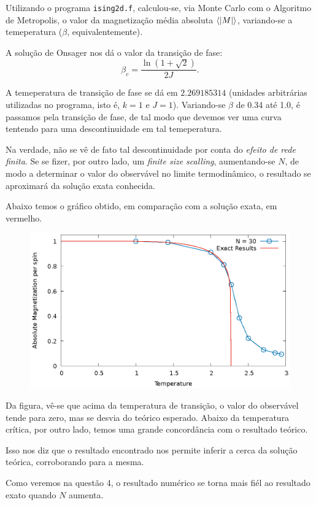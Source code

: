 



  Utilizando o programa \texttt{ising2d.f}, calculou-se, via Monte Carlo com o Algoritmo de Metropolis, o valor da magnetização média absoluta $\ev{\abs{M}}$, variando-se a temeperatura ($\beta$, equivalentemente).

  A solução de Onsager nos dá o valor da transição de fase:
  \begin{equation*}
    \beta_c = \frac{\ln(1+ \sqrt{2})}{2J} .
  \end{equation*}


  A temeperatura de transição de fase se dá em $2.269185314$ (unidades arbitrárias utilizadas no programa, isto é, $k = 1$ e $J = 1$). Variando-se $\beta$ de 0.34 até 1.0, é passamos pela transição de fase, de tal modo que devemos ver uma curva tentendo para uma descontinuidade em tal temeperatura.

  Na verdade, não se vê de fato tal descontinuidade por conta do \textit{efeito de rede finita}. Se se fizer, por outro lado, um \textit{finite size scalling}, aumentando-se $N$, de modo a determinar o valor do observável no limite termodinâmico, o resultado se aproximará da solução exata conhecida.

  Abaixo temos o gráfico obtido, em comparação com a solução exata, em vermelho.

  \begin{figure}[h]
    \includegraphics[scale = 1.0]{Mabs.eps}
  \end{figure}

  \newpage
  Da figura, vê-se que acima da temperatura de transição, o valor do observável tende para zero, mas se desvia do teórico esperado. Abaixo da temperatura crítica, por outro lado, temos uma grande concordância com o resultado teórico.

  Isso nos diz que o resultado encontrado nos permite inferir a cerca da solução teórica, corroborando para a mesma.

  Como veremos na questão 4, o resultado numérico se torna mais fiél ao resultado exato quando $N$ aumenta.


